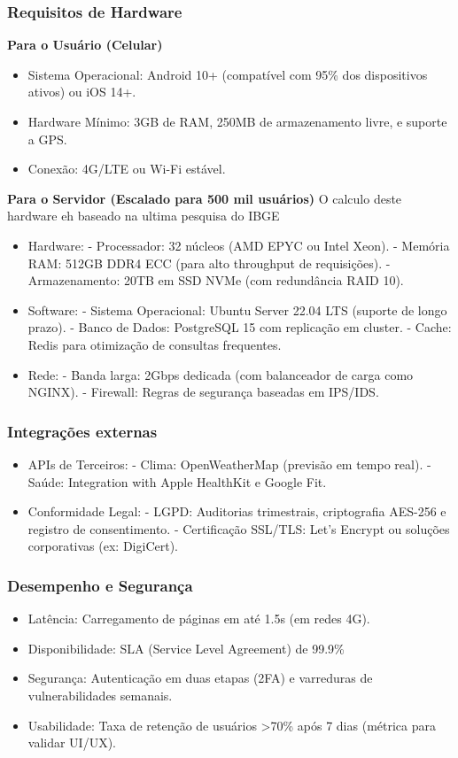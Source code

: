 \documentclass[a4paper, 12pt]{article}
\begin{document}
\subsubsection{Requisitos de Hardware}

\textbf{Para o Usuário (Celular)}
\begin{itemize}[]
\item Sistema Operacional: Android 10+ (compatível com 95\% dos dispositivos ativos) ou iOS 14+.
\item Hardware Mínimo: 3GB de RAM, 250MB de armazenamento livre, e suporte a GPS.
\item Conexão: 4G/LTE ou Wi-Fi estável.
\end{itemize}

\textbf{Para o Servidor (Escalado para 500 mil usuários)}
O calculo deste hardware eh baseado na ultima pesquisa do IBGE \cite{ibge-2022}
\begin{itemize}[]
\item Hardware:
- Processador: 32 núcleos (AMD EPYC ou Intel Xeon).
- Memória RAM: 512GB DDR4 ECC (para alto throughput de requisições).
- Armazenamento: 20TB em SSD NVMe (com redundância RAID 10).
\item Software:
- Sistema Operacional: Ubuntu Server 22.04 LTS (suporte de longo prazo).
- Banco de Dados: PostgreSQL 15 com replicação em cluster.
- Cache: Redis para otimização de consultas frequentes.
\item Rede:
- Banda larga: 2Gbps dedicada (com balanceador de carga como NGINX).
- Firewall: Regras de segurança baseadas em IPS/IDS.
\end{itemize}

\subsubsection{Integrações externas}
\begin{itemize}[]
\item APIs de Terceiros:
- Clima: OpenWeatherMap (previsão em tempo real).
- Saúde: Integration with Apple HealthKit e Google Fit.
\item Conformidade Legal:
- LGPD: Auditorias trimestrais, criptografia AES-256 e registro de consentimento.
- Certificação SSL/TLS: Let's Encrypt ou soluções corporativas (ex: DigiCert).
\end{itemize}

\subsubsection*{Desempenho e Segurança}
\begin{itemize}[]
\item Latência: Carregamento de páginas em até 1.5s (em redes 4G).
\item Disponibilidade: SLA (Service Level Agreement) de 99.9\% 
\item Segurança: Autenticação em duas etapas (2FA) e varreduras de vulnerabilidades semanais.
\item Usabilidade: Taxa de retenção de usuários >70\% após 7 dias (métrica para validar UI/UX).
\end{itemize}
\end{document}

